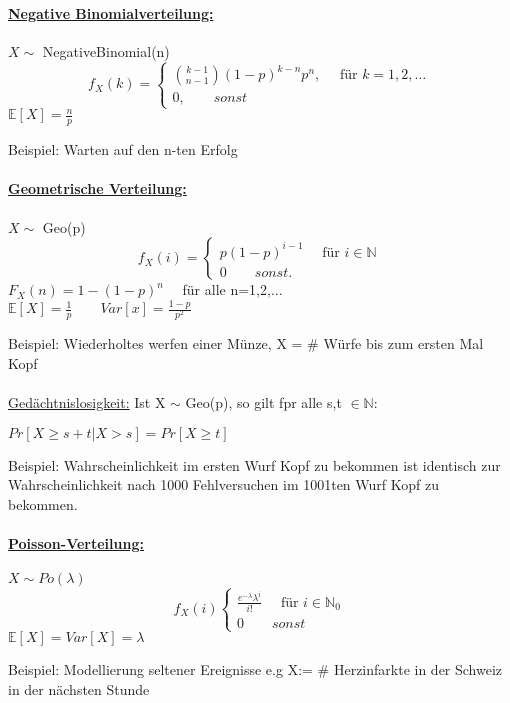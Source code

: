 \documentclass[8pt]{extreport}
\begin{document}
\paragraph{\underline{Negative Binomialverteilung:}}
\begin{center}
$X \sim$ NegativeBinomial(n)
\[ f_X(k) =
\begin{cases}
\binom{k-1}{n-1}(1-p)^{k-n}p^n, \quad \text{ für } k=1,2,\dots\\
0, \qquad sonst
\end{cases}
\]
$\mathbb{E}[X] = \frac{n}{p}$
\end{center} 
Beispiel: Warten auf den n-ten Erfolg
\paragraph{\underline{Geometrische Verteilung:}}
\begin{center}
$ X \sim$ Geo(p)
\[ f_X(i) =
	\begin{cases}
	p(1-p)^{i-1} \quad \text{ für } i \in \mathbb{N}\\
	0 \qquad sonst.
	\end{cases}
\]
$F_X(n) = 1-(1-p)^n \quad$ für alle n=1,2,...\\
$\mathbb{E}[X] = \frac{1}{p} \qquad Var[x] = \frac{1-p}{p^2}$
\end{center}
Beispiel: Wiederholtes werfen einer Münze, X = $\#$ Würfe bis zum ersten Mal Kopf\\ \\
\underline{Gedächtnislosigkeit:} Ist X $\sim$ Geo(p), so gilt fpr alle s,t $\in \mathbb{N}$:
\begin{center}
$Pr[X \geq s + t | X > s] = Pr[X \geq t]$
\end{center}
Beispiel: Wahrscheinlichkeit im ersten Wurf Kopf zu bekommen ist identisch zur Wahrscheinlichkeit nach 1000 Fehlversuchen im 1001ten Wurf Kopf zu bekommen.
\paragraph{\underline{Poisson-Verteilung:}}
\begin{center}
$X \sim Po(\lambda)$
\[ f_X(i)
\begin{cases}
\frac{e^{-\lambda}\lambda^i}{i!} \quad \text{ für } i \in \mathbb{N}_0\\
0 \qquad sonst
\end{cases}
\]
$\mathbb{E}[X] = Var[X] =  \lambda$
\end{center}
Beispiel: Modellierung seltener Ereignisse e.g X:= $\#$ Herzinfarkte in der Schweiz in der nächsten Stunde
\end{document}
